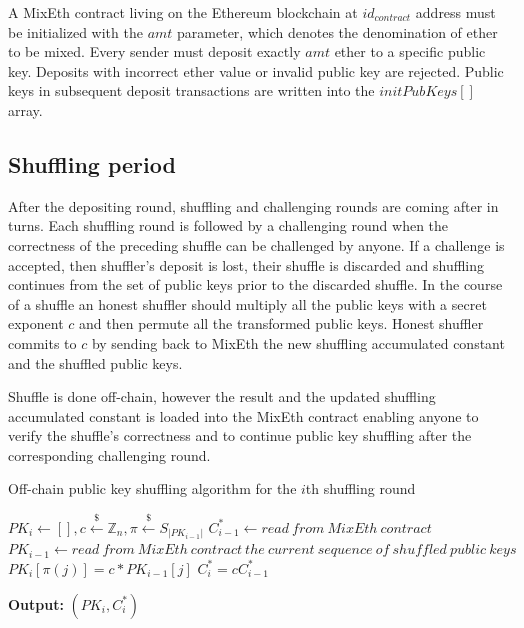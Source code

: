\documentclass[a4paper]{article}
\theoremstyle{definition}
\begin{document}
A MixEth contract living on the Ethereum blockchain at $id_{contract}$ address must be initialized with the $amt$ parameter, which denotes the denomination of ether to be mixed.
Every sender must deposit exactly $amt$ ether to a specific public key. Deposits with incorrect ether value or invalid public key are rejected. Public keys in subsequent deposit transactions are written into the $initPubKeys[]$ array.   

\subsection{Shuffling period}
After the depositing round, shuffling and challenging rounds are coming after in turns. Each shuffling round is followed by a challenging round when the correctness of the preceding shuffle can be challenged by anyone. If a challenge is accepted, then shuffler's deposit is lost, their shuffle is discarded and shuffling continues from the set of public keys prior to the discarded shuffle. In the course of a shuffle an honest shuffler should multiply all the public keys with a secret exponent $c$ and then permute all the transformed public keys. Honest shuffler commits to $c$ by sending back to MixEth the new shuffling accumulated constant and the shuffled public keys.

Shuffle is done off-chain, however the result and the updated shuffling accumulated constant is loaded into the MixEth contract enabling anyone to verify the shuffle's correctness and to continue public key shuffling after the corresponding challenging round.

\begin{algorithm}
\caption{Off-chain public key shuffling algorithm for the $i$th shuffling round}\label{shufflingoffchain}
\begin{algorithmic}[1]
	\State $PK_{i} \gets []
 ,c\stackrel{\$}{\leftarrow}\mathbb{Z}_n,\pi\stackrel{\$}{\leftarrow}S_{|PK_{i-1}|}$
	\State $C^{*}_{i-1}\leftarrow read\ from\ MixEth\ contract$
	\State $PK_{i-1}\leftarrow read\ from\ MixEth\ contract\ the\ current\ sequence\ of\ shuffled\ public\ keys$
	\State $PK_{i}[\pi(j)]=c*PK_{i-1}[j]$ 
	\EndFor
	\State $C^{*}_{i}=cC^{*}_{i-1}$
	
\hspace*{\algorithmicindent} \textbf{Output:} $(PK_{i},C^{*}_{i})$ 
\end{algorithmic}   
\end{algorithm}
\end{document}
